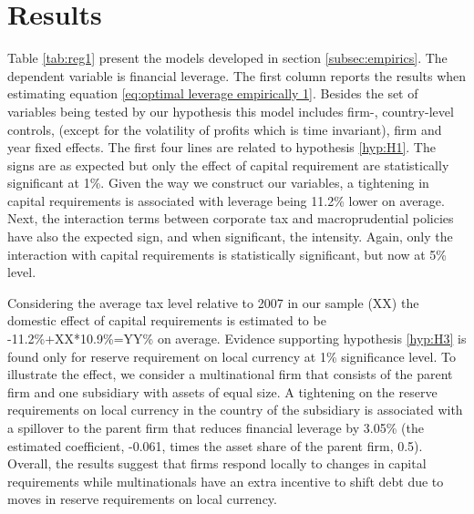 \documentclass[12pt]{article}
\begin{document}
	\section{Results} \label{sec:result}
	 Table \ref{tab:reg1} present the models developed in section \ref{subsec:empirics}. The dependent variable is financial leverage. The first column reports the results when estimating equation \ref{eq:optimal leverage empirically 1}. Besides the set of variables being tested by our hypothesis this model includes firm-, country-level controls, (except for the volatility of profits which is time invariant), firm and year fixed effects. The first four lines are related to hypothesis \ref{hyp:H1}. The signs are as expected but only the effect of capital requirement are statistically significant at 1\%. Given the way we construct our variables, a tightening in capital requirements is associated with leverage being 11.2\% lower on average. Next, the interaction terms between corporate tax and macroprudential policies have also the expected sign, and when significant, the intensity. Again, only the interaction with capital requirements is statistically significant, but now at 5\% level. 
	 
	 	\begin{small}
	 	{
	 		
	 	}
	 \end{small}
 
	 Considering the average tax level relative to 2007 in our sample (XX) the domestic effect of capital requirements is estimated to be -11.2\%+XX*10.9\%=YY\% on average. Evidence supporting hypothesis \ref{hyp:H3} is found only for reserve requirement on local currency at 1\% significance level. To illustrate the effect, we consider a multinational firm that consists of the parent firm and one subsidiary with assets of equal size. A tightening on the reserve requirements on local currency in the country of the subsidiary is associated with a spillover to the parent firm that reduces financial leverage by 3.05\% (the estimated coefficient, -0.061, times the  asset share of the parent firm, 0.5). Overall, the results suggest that firms respond locally to changes in capital requirements while multinationals have an extra incentive to shift debt due to moves in reserve requirements on local currency.
	 
\end{document}
